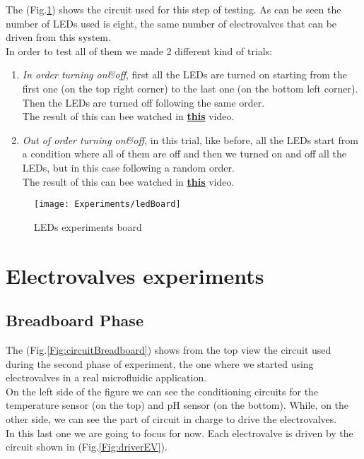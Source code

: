	The (Fig.\ref{Fig:circuitLED}) shows the circuit used for this step of testing. As can be seen the number of LEDs used is eight, the same number of electrovalves that can be driven from this system.\\
	In order to test all of them we made 2 different kind of trials:
	\begin{enumerate}
		\item \textit{In order turning on\&off}, first all the LEDs are turned on starting from the first one (on the top right corner) to the last one (on the bottom left corner). Then the LEDs are turned off following the same order.\\The result of this can bee watched in  \href{http://youtu.be/iYeAMpxM9uI}{\textbf{this}} video.
		\item \textit{Out of order turning on\&off}, in this trial, like before, all the LEDs start from a condition where all of them are off and then we turned on and off all the LEDs, but in this case following a random order.\\ The result of this can bee watched in  \href{http://youtu.be/mIoylW334Ck}{\textbf{this}} video.
	\end{enumerate}
	
	
	\begin{figure}[h]
		\centering
		\texttt{[image: Experiments/ledBoard]}
		\caption{LEDs experiments board}
		\label{Fig:circuitLED}
	\end{figure}
	
	
	\section{Electrovalves experiments}
	
	\subsection{Breadboard Phase}
	The (Fig.\ref{Fig:circuitBreadboard}) shows from the top view the circuit used during the second phase of experiment, the one where we started using electrovalves in a real microfluidic application.\\
	On the left side of the figure we can see the conditioning circuits for the temperature sensor (on the top) and pH sensor (on the bottom). While, on the other side, we can see the part of circuit in charge to drive the electrovalves.\\
	In this last one we are going to focus for now. Each electrovalve is driven by the circuit shown in (Fig.\ref{Fig:driverEV}).
		
